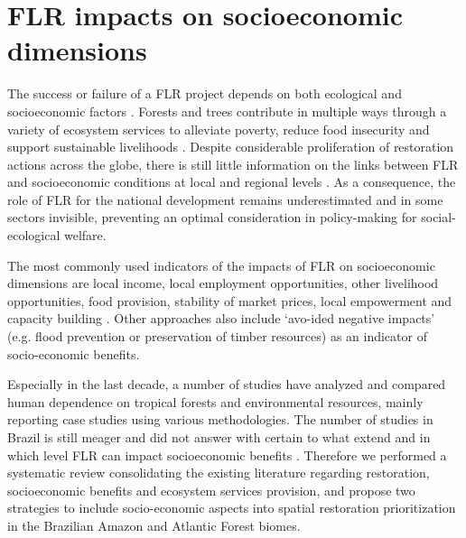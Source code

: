


\chapter{FLR impacts on socioeconomic dimensions} \label{ch:socio}

The success or failure of a FLR project depends on both ecological and socioeconomic factors \cite{Le2012a, Meli2017b}. Forests and trees contribute in multiple ways through a variety of ecosystem services to alleviate poverty, reduce food insecurity and support sustainable livelihoods \citep{FaoNationalSurv}. Despite considerable proliferation of restoration actions across the globe, there is still little information on the links between FLR and socioeconomic conditions at local and regional levels \citep{Chazdon2008, Le2012a, Blignaut2013, Adams2016a, Lazos-Chavero2016}. As a consequence, the role of FLR for the national development remains underestimated and in some sectors invisible, preventing an optimal consideration in policy-making for social-ecological welfare. 

The most commonly used indicators of the impacts of FLR on socioeconomic dimensions are local income, local employment opportunities, other livelihood opportunities, food provision, stability of market prices, local empowerment and capacity building \citep{Le2012a}. Other approaches also include ‘avo-ided negative impacts’ (e.g. flood prevention or preservation of timber resources) as an indicator of socio-economic benefits. 

Especially in the last decade, a number of studies have analyzed and compared human dependence on tropical forests and environmental resources, mainly reporting case studies using various methodologies. The number of studies in Brazil is still meager and did not answer with certain to what extend and in which level FLR can impact socioeconomic benefits \citep{Adams2016a}. Therefore we performed a systematic review consolidating the existing literature regarding restoration, socioeconomic benefits and ecosystem services provision, and propose two strategies to include socio-economic aspects into spatial restoration prioritization in the Brazilian Amazon and Atlantic Forest biomes.

